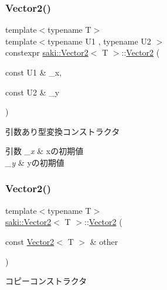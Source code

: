 \subsubsection{\texorpdfstring{Vector2()}{Vector2()}\hspace{0.1cm}{\footnotesize\ttfamily [3/7]}}
{\footnotesize\ttfamily template$<$typename T$>$ \\
template$<$typename U1 , typename U2 $>$ \\
constexpr \mbox{\hyperlink{classsaki_1_1_vector2}{saki\+::\+Vector2}}$<$ T $>$\+::\mbox{\hyperlink{classsaki_1_1_vector2}{Vector2}} (\begin{DoxyParamCaption}\item[{const U1 \&}]{\+\_\+x,  }\item[{const U2 \&}]{\+\_\+y }\end{DoxyParamCaption})\hspace{0.3cm}{\ttfamily [inline]}}



引数あり型変換コンストラクタ 


\begin{DoxyParams}{引数}
{\em \+\_\+x} & xの初期値 \\
\hline
{\em \+\_\+y} & yの初期値 \\
\hline
\end{DoxyParams}
\mbox{\label{classsaki_1_1_vector2_ad4d30b23ef121c4ebc6786885ac5c83f}} 
\subsubsection{\texorpdfstring{Vector2()}{Vector2()}\hspace{0.1cm}{\footnotesize\ttfamily [4/7]}}
{\footnotesize\ttfamily template$<$typename T$>$ \\
\mbox{\hyperlink{classsaki_1_1_vector2}{saki\+::\+Vector2}}$<$ T $>$\+::\mbox{\hyperlink{classsaki_1_1_vector2}{Vector2}} (\begin{DoxyParamCaption}\item[{const \mbox{\hyperlink{classsaki_1_1_vector2}{Vector2}}$<$ T $>$ \&}]{other }\end{DoxyParamCaption})\hspace{0.3cm}{\ttfamily [inline]}}



コピーコンストラクタ 


